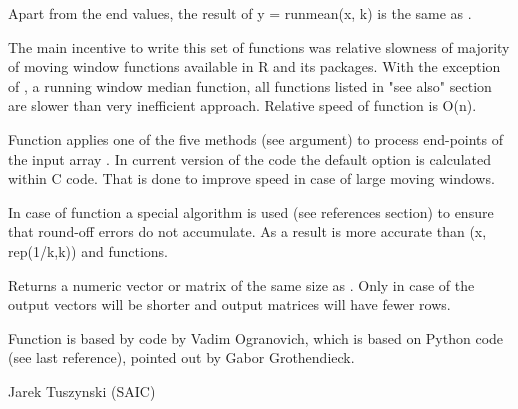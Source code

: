 \begin{Details}\relax
Apart from the end values, the result of y = runmean(x, k) is the same as 
.

The main incentive to write this set of functions was relative slowness of 
majority of moving window functions available in R and its packages.  With the 
exception of , a running window median function, all 
functions listed in "see also" section are slower than very inefficient 
 approach. Relative 
speed of  function is O(n).

Function  applies one of the five methods (see  
argument) to process end-points of the input array . In current 
version of the code the default  option is calculated 
within C code. That is done to improve speed in case of large moving windows.

In case of  function a special algorithm is 
used (see references section) to ensure that round-off errors do not 
accumulate. As a result  is more accurate than 
(x, rep(1/k,k)) and  
functions.
\end{Details}
\begin{Value}
Returns a numeric vector or matrix of the same size as . Only in case of 
 the output vectors will be shorter and output matrices 
will have fewer rows.
\end{Value}
\begin{Note}\relax
Function  is based by code by Vadim Ogranovich,
which is based on Python code (see last reference), pointed out by Gabor 
Grothendieck.
\end{Note}
\begin{Author}\relax
Jarek Tuszynski (SAIC) 
\end{Author}
\begin{References}\relax
{}
\end{References}

